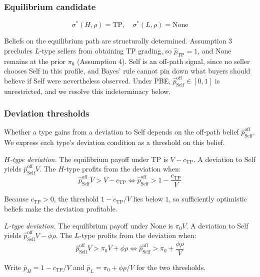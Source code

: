 \documentclass[11pt,letterpaper]{article}
\theoremstyle{definition}
\begin{document}
\subsubsection*{Equilibrium candidate}

\[\sigma^*(H, \rho) = \text{TP}, \quad \sigma^*(L, \rho) = \text{None}\]

Beliefs on the equilibrium path are structurally determined. Assumption 3 precludes $L$-type sellers from obtaining TP grading, so $\hat{p}_{\text{TP}} = 1$, and None remains at the prior $\pi_0$ (Assumption 4). Self is an off-path signal, since no seller chooses Self in this profile, and Bayes' rule cannot pin down what buyers should believe if Self were nevertheless observed. Under PBE, $\hat{p}_{\text{Self}}^{\text{off}} \in [0, 1]$ is unrestricted, and we resolve this indeterminacy below.

\subsubsection*{Deviation thresholds}

Whether a type gains from a deviation to Self depends on the off-path belief $\hat{p}_{\text{Self}}^{\text{off}}$. We express each type's deviation condition as a threshold on this belief.

\textit{$H$-type deviation.} The equilibrium payoff under TP is $V - c_{\text{TP}}$. A deviation to Self yields $\hat{p}_{\text{Self}}^{\text{off}} V$. The $H$-type profits from the deviation when:
\[\hat{p}_{\text{Self}}^{\text{off}} V > V - c_{\text{TP}} \iff \hat{p}_{\text{Self}}^{\text{off}} > 1 - \frac{c_{\text{TP}}}{V}\]

Because $c_{\text{TP}} > 0$, the threshold $1 - c_{\text{TP}}/V$ lies below $1$, so sufficiently optimistic beliefs make the deviation profitable.

\textit{$L$-type deviation.} The equilibrium payoff under None is $\pi_0 V$. A deviation to Self yields $\hat{p}_{\text{Self}}^{\text{off}} V - \phi\rho$. The $L$-type profits from the deviation when:
\[\hat{p}_{\text{Self}}^{\text{off}} V > \pi_0 V + \phi\rho \iff \hat{p}_{\text{Self}}^{\text{off}} > \pi_0 + \frac{\phi\rho}{V}\]

Write $\bar{p}_H = 1 - c_{\text{TP}}/V$ and $\bar{p}_L = \pi_0 + \phi\rho/V$ for the two thresholds.
\end{document}
